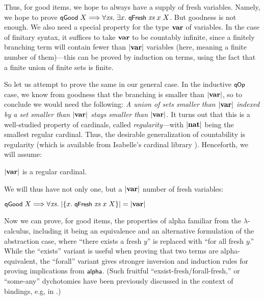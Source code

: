 \documentclass{llncs}
\begin{document}
Thus, for good items, we hope to always have a supply of fresh variables. Namely, we
hope to prove %
$
\mbox{\rm\textsf{\small qGood}}\;X \Longrightarrow \forall \mbox{\textit{xs}}.\;\exists x.\;\mbox{\rm\textsf{\small q\hspace*{-0.1ex}Fresh}}\;\mbox{\textit{xs}}\;x\;X
$. 
But goodness is not enough. 
We also need a special property for the type $\mbox{\bf var}$ of variables. 
In the case of finitary syntax, it suffices to take $\mbox{\bf var}$ to be 
countably infinite, since a finitely branching term will contain fewer than $|\mbox{\bf var}|$ variables 
(here, meaning a finite number of them)---this can be proved by induction on terms, 
using 
the fact that a finite union of finite sets is finite. 

So let us attempt to prove the same in our general case. 
In the inductive $\mbox{\rm\textsf{\small q\hspace*{-0.1ex}Op}}$ case, we know from goodness 
that the branching is smaller than $|\mbox{\bf var}|$, so to conclude we would need the following: 
{\em A union of sets smaller than $|\mbox{\bf var}|$ indexed by a set smaller than $|\mbox{\bf var}|$ 
stays smaller than $|\mbox{\bf var}|$.} It turns out that this is a well-studied property 
of cardinals, called {\em regularity}---with $|\mbox{\bf nat}|$ being the smallest regular cardinal. 
%
Thus, the desirable generalization of countability is regularity 
(which is available from Isabelle's cardinal library \cite{cardHOL}). 
Henceforth, we will assume: 

\begin{ass}\rm \label{ass-reg}
$|\mbox{\bf var}|$ is a regular cardinal. 
\end{ass}

We will thus have not 
only one, but a $|\mbox{\bf var}|$ number of fresh variables: 

\begin{prop}\rm
$\mbox{\rm\textsf{\small qGood}}\;X \Longrightarrow \forall \mbox{\textit{xs}}.\;|\{x.\;\mbox{\rm\textsf{\small q\hspace*{-0.1ex}Fresh}}\;\mbox{\textit{xs}}\;x\;X\}| = |\mbox{\bf var}|$
\end{prop}


Now we can prove, for good items, the properties of alpha familiar from 
the $\lambda$-calculus, including it being an equivalence and an alternative formulation 
of the abstraction case, where ``there exists a fresh $y$'' is replaced with 
``for all fresh $y$.'' While the ``exists'' variant is useful when proving 
that two terms are alpha-equivalent, the ``forall'' variant gives stronger inversion and induction 
rules for proving implications from $\mbox{\rm\textsf{\small alpha}}$. 
(Such fruitful ``exsist-fresh/forall-fresh,'' or ``some-any'' dychotomies have been previously discussed in the context of bindings, e.g, in \cite{DBLP:conf/tphol/NorrishV07,aydemirPOPL08,MillTiu-proofThGenJudg}.) 
\end{document}
